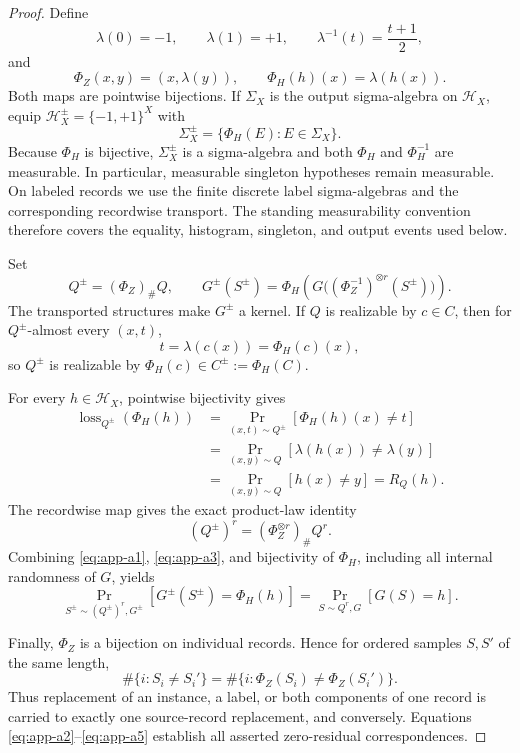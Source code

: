 \begin{proof}
Define
\[
\lambda(0)=-1,\qquad \lambda(1)=+1,\qquad
\lambda^{-1}(t)=\frac{t+1}{2},
\]
and
\[
\Phi_Z(x,y)=(x,\lambda(y)),\qquad
\Phi_H(h)(x)=\lambda(h(x)).
\]
Both maps are pointwise bijections.  If \(\Sigma_X\) is the output
sigma-algebra on \(\mathcal H_X\), equip
\(\mathcal H_X^\pm=\{-1,+1\}^X\) with
\[
\Sigma_X^\pm=\{\Phi_H(E):E\in\Sigma_X\}.
\]
Because \(\Phi_H\) is bijective, \(\Sigma_X^\pm\) is a sigma-algebra
and both \(\Phi_H\) and \(\Phi_H^{-1}\) are measurable.  In particular,
measurable singleton hypotheses remain measurable.  On labeled
records we use the finite discrete label sigma-algebras and the
corresponding recordwise transport.  The standing measurability
convention therefore covers the equality, histogram, singleton, and
output events used below.

Set
\begin{equation}
Q^\pm=(\Phi_Z)_\#Q,\qquad
G^\pm(S^\pm)=
\Phi_H\!\left(
G\bigl((\Phi_Z^{-1})^{\otimes r}(S^\pm)\bigr)
\right).
\label{eq:app-a1}
\end{equation}
The transported structures make \(G^\pm\) a kernel.  If \(Q\) is
realizable by \(c\in C\), then for \(Q^\pm\)-almost every \((x,t)\),
\[
t=\lambda(c(x))=\Phi_H(c)(x),
\]
so \(Q^\pm\) is realizable by
\(\Phi_H(c)\in C^\pm:=\Phi_H(C)\).

For every \(h\in\mathcal H_X\), pointwise bijectivity gives
\begin{equation}
\begin{aligned}
\operatorname{loss}_{Q^\pm}(\Phi_H(h))
&=\Pr_{(x,t)\sim Q^\pm}[\Phi_H(h)(x)\neq t]\\
&=\Pr_{(x,y)\sim Q}[\lambda(h(x))\neq\lambda(y)]\\
&=\Pr_{(x,y)\sim Q}[h(x)\neq y]
=R_Q(h).
\end{aligned}
\label{eq:app-a2}
\end{equation}
The recordwise map gives the exact product-law identity
\begin{equation}
(Q^\pm)^r=(\Phi_Z^{\otimes r})_\#Q^r.
\label{eq:app-a3}
\end{equation}
Combining \eqref{eq:app-a1}, \eqref{eq:app-a3}, and bijectivity of \(\Phi_H\), including all
internal randomness of \(G\), yields
\begin{equation}
\Pr_{S^\pm\sim(Q^\pm)^r,G^\pm}
[G^\pm(S^\pm)=\Phi_H(h)]
=
\Pr_{S\sim Q^r,G}[G(S)=h].
\label{eq:app-a4}
\end{equation}

Finally, \(\Phi_Z\) is a bijection on individual records.  Hence for
ordered samples \(S,S'\) of the same length,
\begin{equation}
\#\{i:S_i\neq S_i'\}
=
\#\{i:\Phi_Z(S_i)\neq\Phi_Z(S_i')\}.
\label{eq:app-a5}
\end{equation}
Thus replacement of an instance, a label, or both components of one
record is carried to exactly one source-record replacement, and
conversely.  Equations \eqref{eq:app-a2}--\eqref{eq:app-a5} establish all asserted
zero-residual correspondences.
\end{proof}

